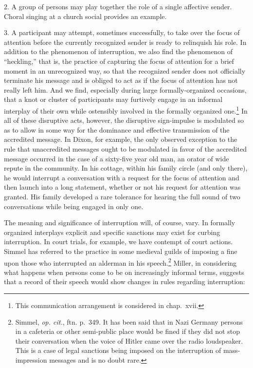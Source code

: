 \documentclass[openany,nobib]{tufte-book}
\begin{document}
2. A group of persons may play together the role of a single affective
sender. Choral singing at a church social provides an example.

3. A participant may attempt, sometimes successfully, to take over the
focus of attention before the currently recognized sender is ready to
relinquish his role. In addition to the phenomenon of interruption, we
also find the phenomenon of ``heckling,'' that is, the practice of
capturing the focus of attention for a brief moment in an unrecognized
way, so that the recognized sender does not officially terminate his
message and is obliged to act as if the focus of attention has not
really left him. And we find, especially during large formally-organized
occasions, that a knot or cluster of participants may furtively engage
in an informal interplay of their own while ostensibly involved in the
formally organized one.\footnote{This communication arrangement is
  considered in chap.~xvii.} In all of these disruptive acts, however,
the disruptive sign-impulse is modulated so as to allow in some way for
the dominance and effective transmission of the accredited message. In
Dixon, for example, the only observed exception to the rule that
unaccredited messages ought to be modulated in favor of the accredited
message occurred in the case of a sixty-five year old man, an orator of
wide repute in the community. In his cottage, within his family circle
(and only there), he would interrupt a conversation with a request for
the focus of attention and then launch into a long statement, whether or
not his request for attention was granted. His family developed a rare
tolerance for hearing the full sound of two conversations while being
engaged in only one.

The meaning and significance of interruption will, of course, vary. In
formally organized interplays explicit and specific sanctions may exist
for curbing interruption. In court trials, for example, we have contempt
of court actions. Simmel has referred to the practice in some medieval
guilds of imposing a fine upon those who interrupted an alderman in his
speech.\footnote{Simmel, \emph{op. cit.}, ftn. p.~349. It has been said
  that in Nazi Germany persons in a cafeteria or other semi-public place
  would be fined if they did not stop their conversation when the voice
  of Hitler came over the radio loudspeaker. This is a case of legal
  sanctions being imposed on the interruption of mass-impression
  messages and is no doubt rare.} Miller, in considering what happens
when persons come to be on increasingly informal terms, suggests that a
record of their speech would show changes in rules regarding
interruption:
\end{document}
